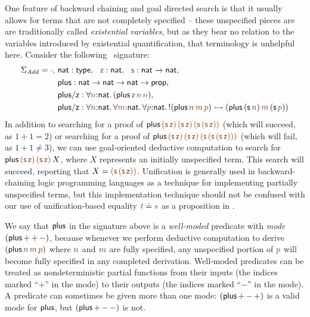 One feature of backward chaining and goal directed search is that it
usually allows for terms that are not completely specified -- these
unspecified pieces are are traditionally called {\it existential
  variables}, but as they bear no relation to the variables introduced
by existential quantification, that terminology is unhelpful
here. Consider the following \sls~signature:
\begin{align*}
 \Sigma_{\it Add} = \cdot, 
~&{\sf nat} : {\sf type}, 
~~\lf{\sf z} : {\sf nat}, 
~~\lf{\sf s} : {\sf nat} \rightarrow {\sf nat},\\
~&{\sf plus} : {\sf nat} \rightarrow {\sf nat} \rightarrow {\sf nat} 
                 \rightarrow {\sf prop},\\
~&{\sf plus/z} : \forall \lf{n}{:}{\sf nat}.\,
({\sf plus}\,\lf{\sf z}\,\lf{n}\,\lf{n}),\\
~&{\sf plus/z} : \forall \lf{n}{:}{\sf nat}.\, 
                 \forall \lf{m}{:}{\sf nat}.\, 
                 \forall \lf{p}{:}{\sf nat}.\,
{!}({\sf plus}\,\lf{n}\,\lf{m}\,\lf{p})
\lefti ({\sf plus}\,({\sf s}\,\lf{n})\,\lf{m}\,({\sf s}\,\lf{p}))
\end{align*}
In addition to searching for a proof of ${\sf plus}\,\lf{\sf
  (s\,z)}\,\lf{\sf (s\,z)}\,\lf{\sf (s\,(s\,z))}$ (which will succeed,
as $1 + 1 = 2$) or searching for a proof of ${\sf plus}\,\lf{\sf
  (s\,z)}\,\lf{\sf (s\,z)}\,\lf{\sf (s\,(s\,(s\,z)))}$ (which will
fail, as $1 + 1 \neq 3$), we can use goal-oriented deductive
computation to search for ${\sf plus}\,\lf{\sf (s\,z)}\,\lf{\sf
  (s\,z)}\,X$, where $X$ represents an initially unspecified term.
This search will succeed, reporting that $X = \lf{\sf
  (s\,(s\,z))}$. Unification is generally used in backward-chaining
logic programming languages as a technique for implementing partially
unspecified terms, but this implementation technique should not be
confused with our use of unification-based equality $\lf{t} \doteq
\lf{s}$ as a proposition in \sls.

We say that ${\sf plus}$ in the signature above is a {\it well-moded}
predicate with {\it mode} $({\sf plus}\,{+}\,{+}\,{-})$, because
whenever we perform deductive computation to derive $({\sf
  plus}\,\lf{n}\,\lf{m}\,\lf{p})$ where $\lf{n}$ and $\lf{m}$ are
fully specified, any unspecified portion of $\lf{p}$ will become fully
specified in any completed derivation. Well-moded predicates can be
treated as nondeterministic partial functions from their inputs (the
indices marked ``${+}$'' in the mode) to their outputs (the indices
marked ``${-}$'' in the mode). A predicate can sometimes be given more
than one mode: $({\sf plus}\,{+}\,{-}\,{+})$ is a valid mode for ${\sf
  plus}$, but $({\sf plus}\,{+}\,{-}\,{-})$ is not.

